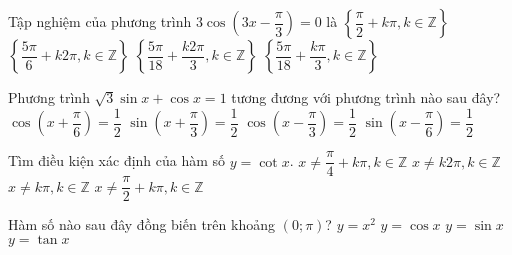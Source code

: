 \begin{ex}%
        Tập nghiệm của phương trình $3\cos\left(3x-\dfrac{\pi}{3}\right)=0$ là
        \choice
        {$\left\{\dfrac{\pi}{2}+k\pi, k \in \mathbb{Z}\right\}$}
        {$\left\{\dfrac{5\pi}{6}+k 2\pi, k \in \mathbb{Z}\right\}$}
        {$\left\{\dfrac{5\pi}{18}+\dfrac{k 2\pi}{3}, k \in \mathbb{Z}\right\}$}
        {\True $\left\{\dfrac{5\pi}{18}+\dfrac{k\pi}{3}, k \in \mathbb{Z}\right\}$}
    \end{ex}

\begin{ex}%
        Phương trình $\sqrt{3}\sin x+\cos x=1$ tương đương với phương trình nào sau đây?
        \choice
        {$\cos \left( x+\dfrac{\pi}{6}\right) =\dfrac{1}{2}$}
        {$\sin \left( x+\dfrac{\pi}{3}\right) =\dfrac{1}{2}$}
        {\True $\cos \left( x-\dfrac{\pi}{3}\right) =\dfrac{1}{2}$}
        {$\sin \left( x-\dfrac{\pi}{6}\right) =\dfrac{1}{2}$}
    \end{ex}

\begin{ex}%
        Tìm điều kiện xác định của hàm số  $y=\cot x$.
        \choice
        {$x \neq \dfrac{\pi}{4}+k \pi, k \in \mathbb{Z}$}
        { $x \neq k 2 \pi, k \in \mathbb{Z}$}
        {\True $x \neq k \pi, k \in \mathbb{Z}$}
        {$x\neq \dfrac{\pi}{2}+k \pi, k \in \mathbb{Z}$}
    \end{ex}

\begin{ex}%
        Hàm số nào sau đây đồng biến trên khoảng $(0;\pi)$?
        \choice
        {\True $y=x^2$}
        {$y=\cos x$}
        {$y=\sin x$}
        {$y=\tan x$}
    \end{ex}

